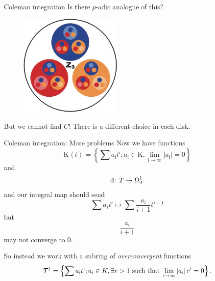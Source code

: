 \begin{frame}{Coleman integration}
    Is there $p$-adic analogue of this?


\begin{figure}
{
    \includegraphics[width=0.45\textwidth]{padic.jpg}
}
\caption*{}
\end{figure}




{
    But we cannot find $C$! There is a different choice in each disk.
}

\end{frame}

\begin{frame}{Coleman integration: More problems}
    Now we have functions
    \[\mathrm{K}\left\langle t\right\rangle=\left\{\sum a_{\mathrm{i}} t^{\mathrm{i}} ; a_{\mathrm{i}} \in \mathrm{K}, \lim _{\mathrm{i} \rightarrow \infty}\left|a_{\mathrm{i}}\right|=0\right\}\]
    and
    \[\mathop{}\!\mathrm{d} \colon T \to \Omega ^1_{T}\]
    and our integral map should send
    \[ \sum a_{i} t^{i}\mapsto\sum \frac{a_{i}}{i+1} t^{i+1} \]
    but\pause
    \[\frac{a_i}{i+1}\]
    may not converge to 0.  \pause

    So instead we work with a subring of \emph{overconvergent} functions
    \[\mathcal{T}^{\dagger}=\left\{\sum a_{\mathrm{i}} t^{\mathrm{i}} ; a_{\mathrm{i}} \in K, \exists r>1 \text { such that } \lim _{\mathrm{i} \rightarrow \infty}\left|a_{\mathrm{i}}\right| r^{\mathrm{i}}=0\right\}\text.\]

\end{frame}


